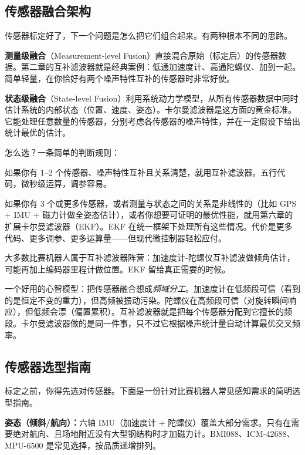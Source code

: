 \subsection{传感器融合架构}

传感器标定好了，下一个问题是怎么把它们组合起来。有两种根本不同的思路。

\textbf{测量级融合}（Measurement-level Fusion）直接混合原始（标定后）的传感器数据。第二章的互补滤波器就是经典案例：低通加速度计、高通陀螺仪、加到一起。简单轻量，在你恰好有两个噪声特性互补的传感器时非常好使。

\textbf{状态级融合}（State-level Fusion）利用系统动力学模型，从所有传感器数据中同时估计系统的内部状态（位置、速度、姿态）。卡尔曼滤波器是这方面的黄金标准。它能处理任意数量的传感器，分别考虑各传感器的噪声特性，并在一定假设下给出统计最优的估计。

怎么选？一条简单的判断规则：

如果你有 1--2 个传感器、噪声特性互补且关系清楚，就用互补滤波器。五行代码，微秒级运算，调参容易。

如果你有 3 个或更多传感器，或者测量与状态之间的关系是非线性的（比如 GPS + IMU + 磁力计做全姿态估计），或者你想要可证明的最优性能，就用第六章的扩展卡尔曼滤波器（EKF）。EKF 在统一框架下处理所有这些情况。代价是更多代码、更多调参、更多运算量——但现代微控制器轻松应付。

大多数比赛机器人属于互补滤波器阵营：加速度计-陀螺仪互补滤波做倾角估计，可能再加上编码器里程计做位置。EKF 留给真正需要的时候。

一个好用的心智模型：把传感器融合想成\textit{频域分工}。加速度计在低频段可信（看到的是恒定不变的重力），但高频被振动污染。陀螺仪在高频段可信（对旋转瞬间响应），但低频会漂（偏置累积）。互补滤波器就是把每个传感器分配到它擅长的频段。卡尔曼滤波器做的是同一件事，只不过它根据噪声统计量自动计算最优交叉频率。

\subsection{传感器选型指南}

标定之前，你得先选对传感器。下面是一份针对比赛机器人常见感知需求的简明选型指南。

\textbf{姿态（倾斜/航向）：}六轴 IMU（加速度计 + 陀螺仪）覆盖大部分需求。只有在需要绝对航向、且场地附近没有大型钢结构时才加磁力计。BMI088、ICM-42688、MPU-6500 是常见选择，按品质递增排列。

